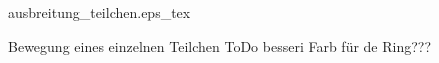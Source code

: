 \begin{figure}
\centering
\def\svgwidth{0.4\columnwidth}
{ausbreitung_teilchen.eps_tex}
\caption{Bewegung eines einzelnen Teilchen ToDo besseri Farb für de Ring??? \label{buch:papers:Wirbelringe:fig:ausbreitung_teilchen}}
\end{figure}